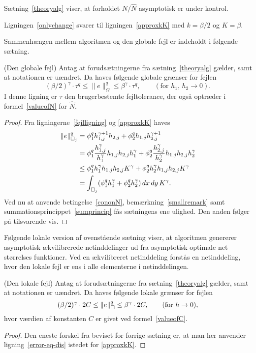 Sætning~\ref{theoryalg} viser, at forholdet $N/\hat{N}$ asymptotisk er
under kontrol. 
\begin{remark} \label{smallremark}
Ligningen~\eqref{onlychange} svarer til ligningen~\eqref{approxkK} med
$k=\beta /2$ og $K=\beta$. 
\end{remark}
Sammenhængen mellem algoritmen og den globale fejl er indeholdt i
følgende sætning.
\begin{theorem}{(Den globale fejl)}
Antag at forudsætningerne fra sætning~\ref{theoryalg} gæl\-der, samt at
notationen er uændret. Da haves følgende globale grænser for fejlen
\begin{equation}
  (\beta/2)^{\gamma} \cdot \tau^q \leq \|e\|_{\Omega}^q 
  \leq \beta^\gamma \cdot \tau^q, 
  \qquad (\text{for $h_1$, $h_2\rightarrow 0$}).
\end{equation}
I denne ligning er $\tau$ den brugerbestemte fejltolerance, der også
optræder i formel~\eqref{valueofN} for $\hat{N}$.
\end{theorem}
\begin{proof}
Fra ligningerne~\eqref{fejlligning} og \eqref{approxkK} haves
\begin{align}
  \|e\|_{\Box_j}^q &= \phi_1^q h_{1,j}^{\gamma +1} h_{2,j} +
    \phi_2^q h_{1,j} h_{2,j}^{\gamma +1} \\
  &= \phi_1^q \frac{h_{1,j}^{\gamma}}{h_1^\gamma} 
    h_{1,j}h_{2,j}h_1^\gamma +
    \phi_2^q \frac{h_{2,j}^{\gamma}}{h_2^\gamma} 
    h_{1,j}h_{2,j}h_2^\gamma \notag \\
  &\leq \phi_1^q h_1^\gamma h_{1,j}h_{2,j} K^\gamma +
    \phi_2^q h_2^\gamma h_{1,j}h_{2,j} K^\gamma \notag \\
  &= \int_{\Box_j} (\phi_1^q h_1^\gamma + \phi_2^q h_2^\gamma)
    \, dx\, dy\, K^\gamma . \notag     
\end{align}
Ved nu at anvende betingelse~\eqref{cononN},
be\-mærk\-ning~\ref{smallremark} samt
sum\-ma\-tions\-prin\-cip\-pet~\eqref{sumprincip} fås sætningens ene ulighed. Den
anden følger på tilsvarende vis. 
\end{proof}

Følgende lokale version af ovenstående sætning viser, at algoritmen
genererer asymptotisk ækvilibrerede netinddelinger ud fra asymptotisk
optimale net størrelses funktioner. Ved en ækvilibreret netinddeling
forstås en netinddeling, hvor den lokale fejl er ens i alle
elementerne i netinddelingen. 
\begin{theorem}{(Den lokale fejl)}
Antag at forudsætningerne fra sætning~\ref{theoryalg} gæl\-der, samt at
notationen er uændret. Da haves følgende lokale grænser for fejlen
\begin{equation}
  (\beta/2)^{\gamma} \cdot 2C \leq \|e\|_{\Box}^q 
  \leq \beta^\gamma \cdot 2C, 
  \qquad (\text{for $h\rightarrow 0$}),
\end{equation}
hvor værdien af konstanten $C$ er givet ved formel~\eqref{valueofC}.
\end{theorem}
\begin{proof}
Den eneste forskel fra beviset for forrige sætning er, at man her
anvender ligning~\eqref{error-eq-dis} istedet for \eqref{approxkK}.
\end{proof}






